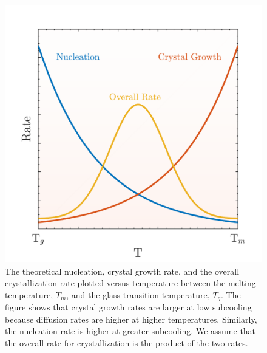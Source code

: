 \begin{figure}[h]
	\centering
	\includegraphics[width = .5\textwidth]{./Figures/Introduction/overall_rates.pdf}
	\caption[The theoretical nucleation, crystal growth rate, and the overall crystallization rate plotted versus temperature between the melting temperature, $T_m$, and the glass transition temperature, $T_g$.  The figure shows that crystal growth rates are larger at low subcooling because diffusion rates are higher at higher temperatures.  Similarly, the nucleation rate is higher at greater subcooling.  We assume that the overall rate for crystallization is the product of the two rates.]{The theoretical nucleation, crystal growth rate, and the overall crystallization rate plotted versus temperature between the melting temperature, $T_m$, and the glass transition temperature, $T_g$.  The figure shows that crystal growth rates are larger at low subcooling because diffusion rates are higher at higher temperatures.  Similarly, the nucleation rate is higher at greater subcooling.  We assume that the overall rate for crystallization is the product of the two rates. \cite{barrett1973the}\cite{Cavagna2009}}
	\label{overall_rates}
\end{figure}


